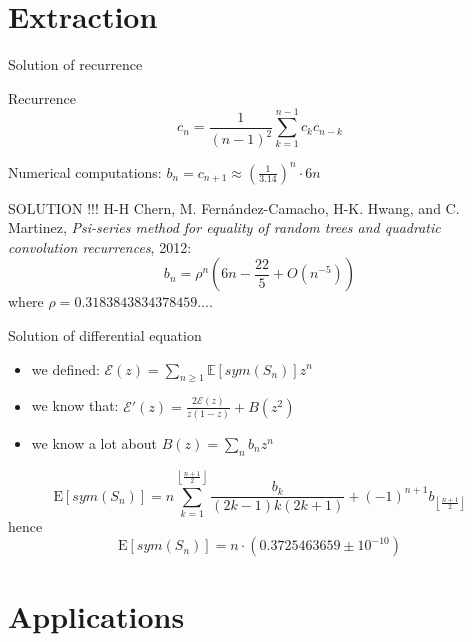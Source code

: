 \documentclass{beamer}
\begin{document}
\section{Extraction}

\begin{frame}{Solution of recurrence}
\begin{block}{Recurrence}
$$
  c_n = \frac{1}{(n-1)^2} \sum_{k=1}^{n-1} c_k c_{n-k}
$$
\end{block}

Numerical computations: $b_n = c_{n+1} \approx (\frac{1}{3.14})^n \cdot 6 n$
\pause
\begin{alertblock}{SOLUTION !!!}
H-H Chern, M. Fernández-Camacho, H-K. Hwang, and
C. Martinez, \textit{Psi-series method for equality of random
trees and quadratic convolution recurrences}, 2012: 
$$
  b_n = \rho^n\left(6 n - \frac{22}{5} + O(n^{-5})\right)
$$
where $\rho = 0.3183843834378459\ldots$.
\end{alertblock}
\end{frame}

\begin{frame}{Solution of differential equation}
\begin{itemize}
\item we defined: $\mathcal{E}(z) = \sum_{n\geq 1} \mathbb{E}[sym(S_n)]z^n$
\item we know that: $\mathcal{E}'(z) = \frac{2\mathcal{E}(z)}{z(1-z)} + B(z^2)$
\item we know a lot about $B(z) = \sum_n b_n z^n$
\end{itemize}

\begin{theorem}
$$
\mathrm{E}[sym(S_n)] = n \sum_{k=1}^{\left\lfloor \frac{n+1}{2}\right\rfloor}
\frac{b_k}{(2k-1)k(2k+1)} + (-1)^{n+1} b_{\left\lfloor \frac{n+1}{2}\right\rfloor}
$$
hence
$$
\mathrm{E}[sym(S_n)] = n\cdot (0.3725463659 \pm 10^{-10})
$$ 
\end{theorem}

\end{frame}

\section{Applications}
\end{document}
